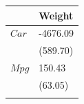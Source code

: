 \begin{tabular}{ll}
\toprule
 & Weight \\
\midrule
$Car$ & -4676.09 \\
 & (589.70) \\
$Mpg$ & 150.43 \\
 & (63.05) \\
 &  \\
\bottomrule
\end{tabular}
